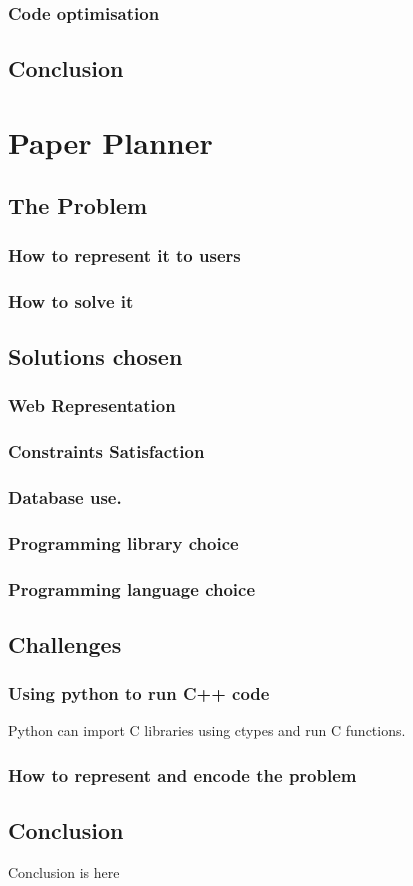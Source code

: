 \documentclass[11pt]{article}
\begin{document}
\subsubsection{Code optimisation}
\label{sec-2_3_7}
\subsection{Conclusion}
\label{sec-2_4}
\section{Paper Planner}
\label{sec-3}
\subsection{The Problem}
\label{sec-3_1}
\subsubsection{How to represent it to users}
\label{sec-3_1_1}
\subsubsection{How to solve it}
\label{sec-3_1_2}
\subsection{Solutions chosen}
\label{sec-3_2}
\subsubsection{Web Representation}
\label{sec-3_2_1}
\subsubsection{Constraints Satisfaction}
\label{sec-3_2_2}
\subsubsection{Database use.}
\label{sec-3_2_3}
\subsubsection{Programming library choice}
\label{sec-3_2_4}
\subsubsection{Programming language choice}
\label{sec-3_2_5}
\subsection{Challenges}
\label{sec-3_3}
\subsubsection{Using python to run C++ code}
\label{sec-3_3_1}

Python can import C libraries using ctypes and run C functions.
\subsubsection{How to represent and encode the problem}
\label{sec-3_3_2}
\subsection{Conclusion}
\label{sec-3_4}

Conclusion is here
\end{document}
